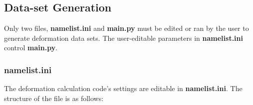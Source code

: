 \documentclass{article}
\begin{document}
    \subsection{Data-set Generation}

        Only two files, \textbf{namelist.ini} and \textbf{main.py} must be edited or ran by the user to generate deformation data sets. The user-editable parameters in \textbf{namelist.ini} control \textbf{main.py}.

        \subsubsection{\textbf{namelist.ini}}

        The deformation calculation code's settings are editable in \textbf{namelist.ini}. The structure of the file is as follows:
\end{document}
